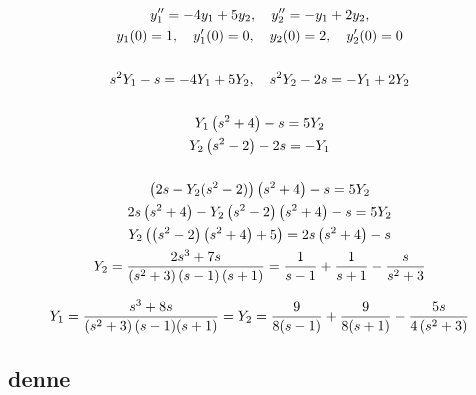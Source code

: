 \begin{gather*}
	y_1'' = - 4 y_1 + 5 y_2, \quad
	y_2'' = - y_1 + 2 y_2,
	\\
	y_1(0) = 1, \quad
	y_1'(0) = 0, \quad
	y_2(0) = 2, \quad
	y_2'(0) = 0
	\\ \\
	s^2 Y_1 - s = - 4 Y_1 + 5 Y_2, \quad
	s^2 Y_2 - 2 s = - Y_1 + 2 Y_2
	\\ \\
	Y_1 \left( s^2 + 4 \right) - s = 5 Y_2
	\\
	Y_2 \left( s^2 - 2 \right) - 2 s = - Y_1
	\\ \\
	\left( 2 s - Y_2 (s^2 - 2) \right) \left( s^2 + 4 \right) - s = 5 Y_2 \\
	2s \left( s^2 + 4 \right) - Y_2 \left( s^2 - 2 \right) \left( s^2 + 4 \right) - s = 5 Y_2
	\\
	Y_2 \left( \left( s^2 - 2 \right) \left( s^2 + 4 \right) + 5 \right) = 2 s \left( s^2 + 4 \right) - s \\
	Y_2 = \frac{2 s^3 + 7 s}{\left( s^2 + 3 \right) \left( s - 1 \right) \left( s + 1 \right)} =
	\frac{1}{s - 1} + \frac{1}{s + 1} - \frac{s}{s^2 + 3} \\
\end{gather*}

\newpage

\begin{gather*}
	Y_1 = \frac{s^3 + 8 s}{\left( s^2 + 3 \right) (s- 1) (s + 1)} =
	Y_2 = \frac{9}{8(s - 1)} + \frac{9}{8(s + 1)} - \frac{5 s}{4 \left( s^2 + 3 \right)}
\end{gather*}



\subsection*{denne}
